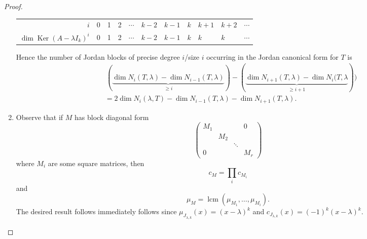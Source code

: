 \documentclass[a4paper]{article}
\newcommand{\Ker}{\operatorname{Ker}}
\newcommand{\lcm}{\operatorname{lcm}}
\theoremstyle{definition}
\begin{document}
\begin{proof}
\begin{enumerate}
    \begin{table}[h]
    \begin{tabular}{r|llllllllll}
        $i$ & 0 & 1 & 2 & $\cdots$ & $k-2$ & $k-1$ & $k$ & $k+1$ & $k+2$ & $\cdots$ \\
        $\dim \Ker (A-\lambda I_k)^i$  & 0 & 1 & 2 & $\cdots$ & $k-2$ & $k-1$ & $k$ & $k$   & $k$   & $\cdots$
    \end{tabular}
    \end{table}
    
    Hence the number of Jordan blocks of precise degree $i$/size $i$ occurring in the Jordan canonical form for $T$ is
\[
\begin{aligned}
        &\, (\underbrace{\dim N_i(T,\lambda)-\dim N_{i-1}(T,\lambda)}_{\geq i})-(\underbrace{\dim N_{i+1}(T,\lambda)-\dim N_{i}(T,\lambda}_{\geq i+1}))\\&=2\dim N_i(\lambda,T)-\dim N_{i-1}(T,\lambda)-\dim N_{i+1}(T,\lambda).
    \end{aligned}
\]
    
    \item Observe that if $M$ has block diagonal form
\[
\begin{pmatrix}M_1 & & & 0\\ & M_2 & & \\ & & \ddots & \\ 0 & & & M_r\end{pmatrix}
\]
where $M_i$ are some square matrices, then
\[
c_{M}=\prod_i c_{M_i}
\]
and
\[
\mu_{M}=\lcm (\mu_{M_1},\ldots,\mu_{M_i}) .
\]
The desired result follows immediately follows since $\mu_{J_{\lambda,k}}(x)=(x-\lambda)^k$ and $c_{J_{\lambda,k}}(x)=(-1)^k(x-\lambda)^k$.
\end{enumerate}
\end{proof}
\end{document}
